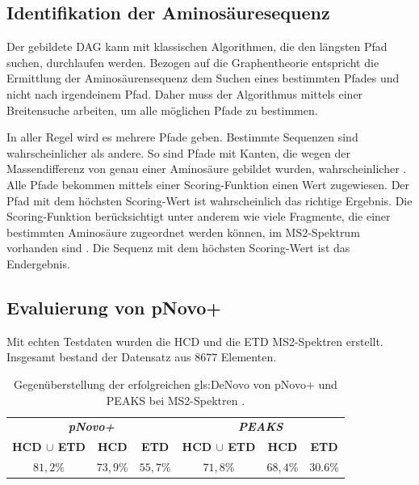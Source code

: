 \documentclass[a4paper, 12pt]{article}
\newcommand{\dashAndSpace}{\textendash \space}
\begin{document}
\subsection{Identifikation der Aminosäuresequenz}
Der gebildete DAG kann mit klassischen Algorithmen, die den längsten Pfad suchen, durchlaufen werden. Bezogen auf die Graphentheorie entspricht die Ermittlung der Aminosäurensequenz dem Suchen eines bestimmten Pfades \dashAndSpace und nicht nach irgendeinem Pfad. Daher muss der Algorithmus mittels einer Breitensuche arbeiten, um alle möglichen Pfade zu bestimmen.

In aller Regel wird es mehrere Pfade geben. Bestimmte Sequenzen sind wahrscheinlicher als andere. So sind Pfade mit Kanten, die wegen der Massendifferenz von genau einer Aminosäure gebildet wurden, wahrscheinlicher \cite{pNovoPlus}. Alle Pfade bekommen mittels einer Scoring-Funktion einen Wert zugewiesen. Der Pfad mit dem höchsten Scoring-Wert ist wahrscheinlich das richtige Ergebnis. Die Scoring-Funktion berücksichtigt unter anderem wie viele Fragmente, die einer bestimmten Aminosäure zugeordnet werden können, im MS2-Spektrum vorhanden sind \cite{pNovo}. Die Sequenz mit dem höchsten Scoring-Wert ist das Endergebnis.

\subsection{Evaluierung von pNovo+}
Mit echten Testdaten wurden die HCD und die ETD MS2-Spektren erstellt. Insgesamt bestand der Datensatz aus $ 8677 $ Elementen.

\begin{table}[H]
   \hspace*{0.75cm}
   \centering
   \begin{tabular}{c|c|c|c|c|c}
      \toprule
      \multicolumn{3}{c|}{\emph{\textbf{pNovo+}}} & \multicolumn{3}{c}{\emph{\textbf{PEAKS}}} \\
      \textbf{HCD $\cup$ ETD} & \textbf{HCD} & \textbf{ETD} & \textbf{HCD $\cup$ ETD} & \textbf{HCD} & \textbf{ETD} \\
      \midrule
      $81,2 \%$ & $73,9 \%$ & $55,7 \%$ & $71,8 \%$ & $68,4 \%$ & $30.6 \%$\\
      \bottomrule
   \end{tabular}
   \newline
   \caption{Gegenüberstellung der erfolgreichen \gls{gls:DeNovo} von pNovo+ und PEAKS bei MS2-Spektren \cite[620]{pNovoPlus}.}
   \label{tab:PNovoPlusResults}
\end{table}
\end{document}
